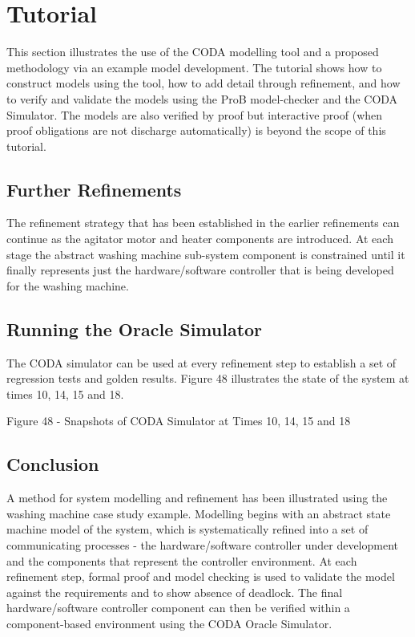 \section{Tutorial}
\label{sec:component_diagrams-tutorial}

This section illustrates the use of the CODA modelling tool and a proposed methodology via an example model development. The tutorial shows how to construct models using the tool, how to add detail through refinement, and how to verify and validate the models using the ProB model-checker and the CODA Simulator. The models are also verified by proof but interactive proof (when proof obligations are not discharge automatically) is beyond the scope of this tutorial.
 
 
 
 
 
 
 
\subsection{Further Refinements}
 
The refinement strategy that has been established in the earlier refinements can continue as the agitator motor and heater components are introduced. At each stage the abstract washing machine sub-system component is constrained until it finally represents just the
  hardware/software controller
   that is being developed for the washing machine.
 
\subsection{Running the Oracle Simulator}
 
The CODA simulator can be used at every refinement step to establish a set of regression tests and golden results. Figure 48 illustrates the state of the system at times 10, 14, 15 and 18.

Figure 48 - Snapshots of CODA Simulator at Times 10, 14, 15 and 18
 
\subsection{Conclusion}
 
A method for system modelling and refinement has been illustrated using the washing machine case study example. Modelling begins with an abstract state machine model of the system, which is systematically refined into a set of communicating processes - the hardware/software controller under development and the components that represent the controller environment.
At each refinement step, formal proof and model checking is used to validate the model against the requirements and to show absence of deadlock.
The final hardware/software controller component can then be verified within a component-based environment using the CODA Oracle Simulator.


